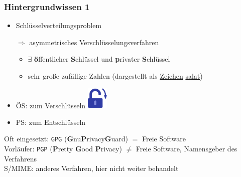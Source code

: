 \documentclass{beamer}
\begin{document}
\begin{frame}[label=bg2]
  \frametitle{Hintergrundwissen 1}
  
  \begin{itemize}
   \item Schlüsselverteilungsproblem
   \item[$\Rightarrow$] asymmetrisches Verschlüsselungsverfahren
   \begin{itemize}
    \item $\exists$ \textbf{ö}ffentlicher \textbf{S}chlüssel
    und \textbf{p}rivater \textbf{S}chlüssel
    \item sehr große zufällige Zahlen (dargestellt als \href{https://cknoll.github.io/files/pub-key-carsten.txt}{Zeichen}%
    \href{file:///home/ck/pub-key-carsten-demo.txt}{salat})
   \end{itemize}
   \pause
   \item ÖS: zum Verschlüsseln \hspace{5mm}\includegraphics[width=10mm]{img-src/padlock-lock}
   

   
   \item PS: zum Entschlüsseln 

  \end{itemize}
\pause
  Oft eingesetzt: \texttt{GPG} (\textbf{G}nu\textbf{P}rivacy\textbf{G}uard) $=$ Freie Software\\[2mm]
  {\tiny Vorläufer: \texttt{PGP} (\textbf{P}retty \textbf{G}ood \textbf{P}rivacy) $\neq$ Freie Software, Namensgeber des Verfahrens}\\
  {\tiny S/MIME: anderes Verfahren, hier nicht weiter behandelt}
  
  
\end{frame}
\end{document}
